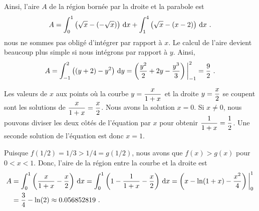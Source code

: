 {Ainsi, l'aire $A$ de la région bornée par la droite et la parabole est
\[
A = \int_0^1 \left( \sqrt{x} - (- \sqrt{x})\right) \,\mathrm{d}x +
\int_1^4 \left( \sqrt{x} - (x-2)\right) \,\mathrm{d}x \ .
\]
nous ne sommes pas obligé d'intégrer par rapport à $x$.  Le calcul de l'aire
devient beaucoup plus simple si nous intégrons par rapport à $y$.  Ainsi,
\[
A = \int_{-1}^2 \left( (y+2) - y^2 \right) \,\mathrm{d}y
= \left( \frac{y^2}{2} + 2 y - \frac{y^3}{3} \right)\bigg|_{-1}^2
= \frac{9}{2} \ .
\]

 Les valeurs de $x$ aux points où la courbe
$\displaystyle y=\frac{x}{1+x}$ et la droite $\displaystyle y=\frac{x}{2}$ se
coupent sont les solutions de 
$\displaystyle \frac{x}{1+x} = \frac{x}{2}$.  Nous avons la solution $x=0$.
Si $x\neq 0$, nous pouvons diviser les deux côtés de l'équation par $x$ pour
obtenir $\displaystyle \frac{1}{1+x} = \frac{1}{2}$.  Une seconde
solution de l'équation est donc $x=1$.

Puisque $f(1/2) = 1/3 > 1/4 = g(1/2)$, nous avons que $f(x)>g(x)$ pour $0<x<1$.
Donc, l'aire de la région entre la courbe et la droite est
\begin{align*}
A &= \int_0^1 \left( \frac{x}{1+x} - \frac{x}{2} \right) \,\mathrm{d}x
= \int_0^1 \left( 1 - \frac{1}{1+x} - \frac{x}{2} \right) \,\mathrm{d}x
= \left( x - \ln(1+x) - \frac{x^2}{4} \right)\bigg|_0^1 \\
&= \frac{3}{4} - \ln(2) \approx 0.056852819  \ .
\end{align*}
}


